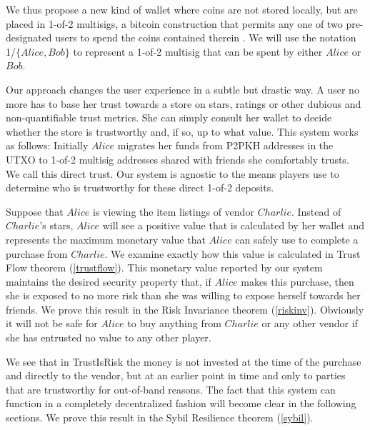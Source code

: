 \documentclass[11pt]{llncs}
\theoremstyle{definition}
\begin{document}
     We thus propose a new kind of wallet where coins are not stored locally, but are placed in 1-of-2 multisigs, a bitcoin
     construction that permits any one of two pre-designated users to spend the coins contained therein
     \cite{masteringbitcoin}. We will use the notation 1/$\{Alice, Bob\}$ to represent a 1-of-2 multisig that can be spent by
     either $Alice$ or $Bob$.

     Our approach changes the user experience in a subtle but drastic way. A user no more has to base her trust towards a
     store on stars, ratings or other dubious and non-quantifiable trust metrics. She can simply consult her wallet to
     decide whether the store is trustworthy and, if so, up to what value. This system works as follows: Initially $Alice$
     migrates her funds from P2PKH addresses in the UTXO \cite{masteringbitcoin} to 1-of-2 multisig addresses shared with
     friends she comfortably trusts. We call this direct trust. Our system is agnostic to the means players use to determine
     who is trustworthy for these direct 1-of-2 deposits.

     Suppose that $Alice$ is viewing the item listings of vendor $Charlie$. Instead of $Charlie$'s stars, $Alice$ will see a
     positive value that is calculated by her wallet and represents the maximum monetary value that $Alice$ can safely use to
     complete a purchase from $Charlie$. We examine exactly how this value is calculated in Trust Flow theorem
     (\ref{trustflow}). This monetary value reported by our system maintains the desired security property that, if $Alice$
     makes this purchase, then she is exposed to no more risk than she was willing to expose herself towards her friends.
     We prove this result in the Risk Invariance theorem (\ref{riskinv}). Obviously it will not be safe for $Alice$ to buy
     anything from $Charlie$ or any other vendor if she has entrusted no value to any other player.

     We see that in TrustIsRisk the money is not invested at the time of the purchase and directly to the vendor, but at an
     earlier point in time and only to parties that are trustworthy for out-of-band reasons. The fact that this system can
     function in a completely decentralized fashion will become clear in the following sections. We prove this result in the
     Sybil Resilience theorem (\ref{sybil}).
\end{document}
